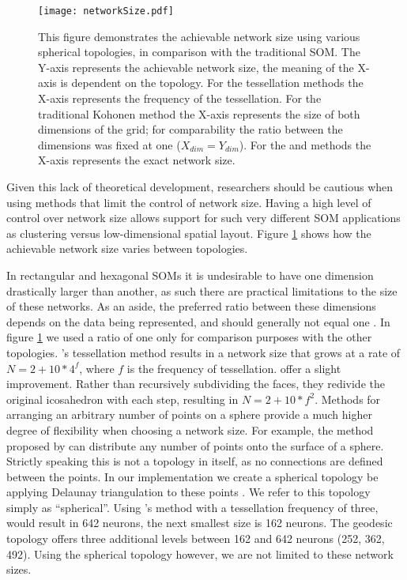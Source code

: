 \begin{figure}[htb]
\centering
\texttt{[image: networkSize.pdf]}
\caption{This figure demonstrates the achievable network size using various
spherical topologies, in comparison with the traditional SOM. The Y-axis represents the achievable network size, the
meaning of the X-axis is dependent on the topology. For the tessellation
methods the X-axis represents the frequency of the tessellation. For the
traditional Kohonen method the X-axis represents the size of both dimensions of
the grid; for comparability the ratio between the dimensions was fixed at one
($X_{dim}=Y_{dim}$).  For the \cite{Rakhmanov94} and \cite{Nishio:2006fk} methods the X-axis
represents the exact network size.}
\label{fig:nSize}
\end{figure}

Given this lack of theoretical development, researchers should be cautious
when using methods that limit the control of network size.  Having a high
level of control over network size allows support for such very different SOM
applications as clustering versus low-dimensional spatial layout.
  Figure
\ref{fig:nSize} shows how the achievable network size varies between
topologies.

In rectangular and hexagonal SOMs it is undesirable to have one dimension
drastically larger than another, as such there are practical limitations to
the size of these networks.  As an aside, the preferred ratio between these
dimensions depends on the data being represented, and should generally not
equal one \citep{kohonen1996, toolbox}.  In figure \ref{fig:nSize} we used a
ratio of one only for comparison purposes with the other topologies.
\citeauthor{ritter99}'s tessellation method results in a network size that
grows at a rate of \(N=2+10*4^f\), where $f$ is the frequency of tessellation.
\cite{wu2006} offer a slight improvement. Rather than recursively subdividing
the faces, they redivide the original icosahedron with each step, resulting in
\(N=2+10*f^2\).  Methods for arranging an arbitrary number of points on a
sphere provide a much higher degree of flexibility when choosing a network
size.  For example, the method proposed by \cite{Rakhmanov94} can
distribute any number of points onto the surface of a sphere.  Strictly
speaking this is not a topology in itself, as no connections are defined
between the points.  In our implementation we create a spherical topology be
applying Delaunay triangulation to these points \cite{Ranka97}.  We refer to
this topology simply as ``spherical''. Using \citeauthor{ritter99}'s method
with a tessellation frequency of three, would result in 642 neurons, the next
smallest size is 162 neurons.  The geodesic topology offers three additional
levels between 162 and 642 neurons (252, 362, 492).  Using the spherical
topology however, we are not limited to these network sizes.


